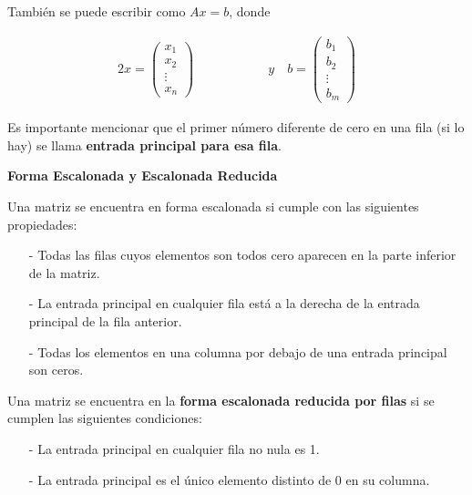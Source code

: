 \documentclass{article}
\begin{document}
\pagebreak

También se puede escribir como $Ax = b$, donde 

\begin{alignat*}{2}
    x= \begin{pmatrix}
        x_1\\
        x_2\\
        \vdots\\
        x_n
    \end{pmatrix} 
& \hspace{ 4em}%
\quad y \quad b = 
    \begin{pmatrix}
        b_1\\
        b_2\\
        \vdots\\
        b_m
    \end{pmatrix} 
\end{alignat*}

Es importante mencionar que el primer número diferente de cero en una fila (si lo hay) se llama \textbf{entrada principal para esa fila}. 

\begin{large}
    \textbf{Forma Escalonada y Escalonada Reducida}
\end{large}

Una matriz se encuentra en forma escalonada si cumple con las siguientes propiedades:

\begin{tcolorbox}[colback=blue!10!white,colframe=blue!60!black,title=Propiedades de la Forma Escalonada]
    \begin{itemize}
        \item[-] Todas las filas cuyos elementos son todos cero aparecen en la parte inferior de la matriz.
        \item[-] La entrada principal en cualquier fila está a la derecha de la entrada principal de la fila anterior.
        \item[-] Todas los elementos en una columna por debajo de una entrada principal son ceros.
    \end{itemize}   
    Una matriz se encuentra en la \textbf{forma escalonada reducida por filas} si se cumplen las siguientes condiciones:
    \begin{itemize}
        \item[-] La entrada principal en cualquier fila no nula es 1.
        \item[-] La entrada principal es el único elemento distinto de 0 en su columna.
    \end{itemize}    
\end{tcolorbox}
\end{document}
